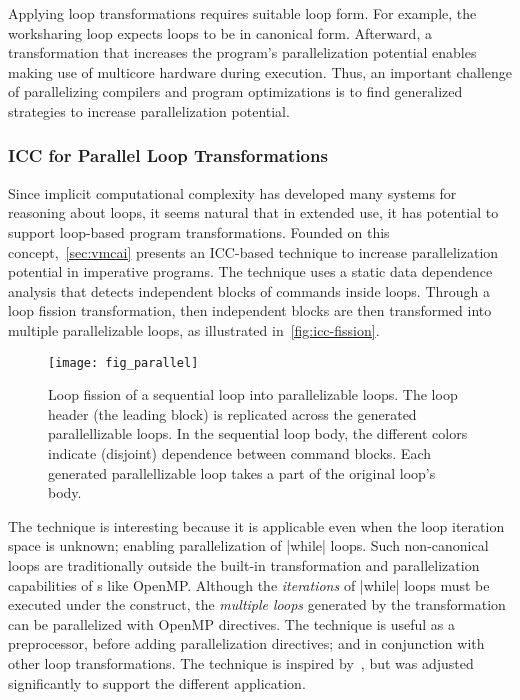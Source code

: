 Applying loop transformations requires suitable loop form.
For example, the worksharing loop expects loops to be in canonical form.
Afterward, a transformation that increases the program's parallelization potential enables making use of multicore hardware during execution.
Thus, an important challenge of parallelizing compilers and program optimizations is to find generalized strategies to increase parallelization potential.

\subsubsection{ICC for Parallel Loop Transformations}
\label{icc-fission}

Since implicit computational complexity has developed many systems for reasoning about loops, it seems natural that in extended use, it has potential to support loop-based program transformations.
Founded on this concept,~\autoref{sec:vmcai} presents an ICC-based technique to increase parallelization potential in imperative programs.
The technique uses a static data dependence analysis that detects independent blocks of commands inside loops.
Through a loop fission transformation,
then independent blocks are then transformed into multiple parallelizable loops, as illustrated in~\autoref{fig:icc-fission}.

\begin{figure}[h]
{\vspace{1em}\centering\texttt{[image: fig\_parallel]}}
\caption[Loop fission transformation]
{Loop fission of a sequential loop into parallelizable loops.
The loop header (the leading  block) is replicated across the generated parallellizable loops.
In the sequential loop body, the different colors indicate (disjoint) dependence between command blocks.
Each generated parallellizable loop takes a part of the original loop's body.}\label{fig:icc-fission}
\end{figure}

The technique is interesting because it is applicable even when the loop iteration space is unknown;
enabling parallelization of \eg \pr|while| loops.
Such non-canonical loops are traditionally outside the built-in transformation and parallelization capabilities of s like OpenMP\@.
Although the \emph{iterations} of \pr|while| loops must be executed under the  construct,
the \emph{multiple loops} generated by the transformation can be parallelized with OpenMP directives.
The technique is useful as a preprocessor, before adding parallelization directives;
and in conjunction with other loop transformations.
The technique is inspired by~\cite{moyen20172}, but was adjusted significantly to support the different application.

